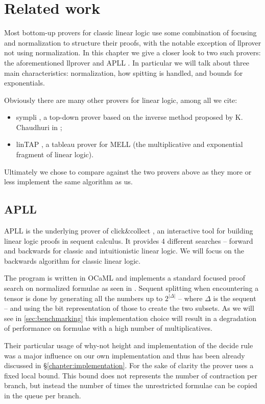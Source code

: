\chapter{Related work}\label{chapter:related work}
Most bottom-up provers for classic linear logic use some combination of focusing and normalization to structure their proofs, with the notable exception of llprover \cite{llprover} not using normalization.	%
In this chapter we give a closer look to two such provers: the aforementioned llprover and APLL \cite{APLL}.
In particular we will talk about three main characteristics: normalization, how spitting is handled, and bounds for exponentials.

Obviously there are many other provers for linear logic, among all we cite: 
\begin{itemize}
	\item sympli \cite{sympli}, a top-down prover based on the inverse method proposed by K. Chaudhuri in \cite{inverse};
	\item linTAP \cite{linTAPwebsite, linTAP}, a tableau prover for MELL (the multiplicative and exponential fragment of linear logic).
\end{itemize}
Ultimately we chose to compare against the two provers above as they more or less implement the same algorithm as us.

\section{APLL}\label{sec:apll}
APLL is the underlying prover of click\&collect \cite{clickAndCollect}, an interactive tool for building linear logic proofs in sequent calculus.
It provides 4 different searches -- forward and backwards for classic and intuitionistic linear logic. 
We will focus on the backwards algorithm for classic linear logic.

The program is written in OCaML and implements a standard focused proof search on normalized formulae as seen in \cite{LiangMiller}.
Sequent splitting when encountering a tensor is done by generating all the numbers up to $2^{|\Delta|}$ -- where $\Delta$ is the sequent -- and using the bit representation of those to create the two subsets.
As we will see in \ref{sec:benchmarking} this implementation choice will result in a degradation of performance on formulae with a high number of multiplicatives.

Their particular usage of why-not height and implementation of the decide rule was a major influence on our own implementation and thus has been already discussed in \S\ref{chapter:implementation}.
For the sake of clarity the prover uses a fixed local bound.
This bound does not represents the number of contraction per branch, but instead the number of times the unrestricted formulae can be copied in the queue per branch.

